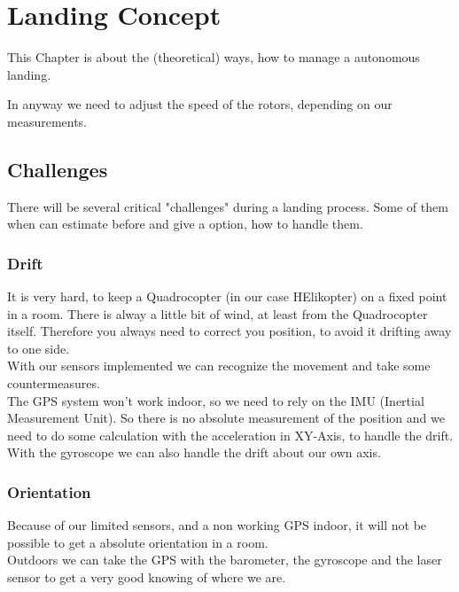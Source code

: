 
\chapter{Landing Concept}
\label{cha:LandingCon}


This Chapter is about the (theoretical) ways, how to manage a autonomous landing.

In anyway we need to adjust the speed of the rotors, depending on our measurements.


\section{Challenges}
\label{sec:landcha}

There will be several critical "challenges" during a landing process. Some of them when can estimate before and give a option, how to handle them.


\subsection{Drift}

It is very hard, to keep a Quadrocopter (in our case HElikopter) on a fixed point in a room. There is alway a little bit of wind, at least from the Quadrocopter itself. Therefore you always need to correct you position, to avoid it drifting away to one side.\\
With our sensors implemented we can recognize the movement and take some countermeasures.\\

The GPS system won't work indoor, so we need to rely on the IMU (Inertial Measurement Unit). So there is no absolute measurement of the position and we need to do some calculation with the acceleration in XY-Axis, to handle the drift.\\

With the gyroscope we can also handle the drift about our own axis.


\subsection{Orientation}

Because of our limited sensors, and a non working GPS indoor, it will not be possible to get a absolute orientation in a room.\\

Outdoors we can take the GPS with the barometer, the gyroscope and the laser sensor to get a very good knowing of where we are.


